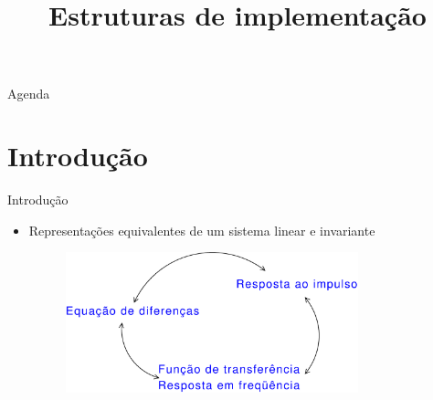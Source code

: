 


\title{\cursogrande\\ \vspace{1cm}Estruturas de implementação}


\maketitle[randomdots={false}]
   \begin{slide}{Agenda}
      \tableofcontents[content=sections]
   \end{slide}


\section{Introdução}

\begin{slide}{Introdu\c c\~ao}
\begin{itemize}
   \item Representações equivalentes de um sistema linear e invariante
   \begin{figure}
      \centering
      \includegraphics[width = 0.8\textwidth]{figs/Estrut_intro01.eps}
   \end{figure}
\end{itemize}
\end{slide}

